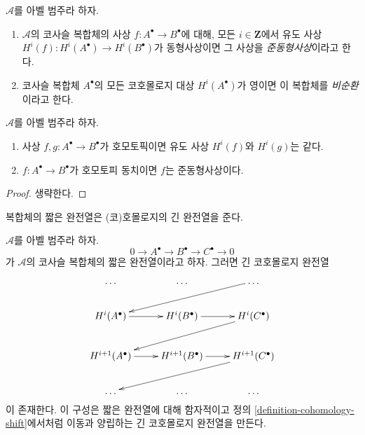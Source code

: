 \begin{definition}
\label{definition-quasi-isomorphism-cochain}
$\mathcal{A}$를 아벨 범주라 하자.
\begin{enumerate}
\item $\mathcal{A}$의 코사슬 복합체의 사상
$f : A^\bullet \to B^\bullet$에 대해, 모든 $i \in \mathbf{Z}$에서
유도 사상 $H^i(f) : H^i(A^\bullet) \to H^i(B^\bullet)$가
동형사상이면 그 사상을 {\it 준동형사상}이라고 한다.
\item 코사슬 복합체 $A^\bullet$의 모든 코호몰로지 대상
$H^i(A^\bullet)$가 영이면 이 복합체를 {\it 비순환}이라고 한다.
\end{enumerate}
\end{definition}

\begin{lemma}
\label{lemma-map-cohomology-homotopy-cochain}
$\mathcal{A}$를 아벨 범주라 하자.
\begin{enumerate}
\item 사상 $f, g : A^\bullet \to B^\bullet$가 호모토픽이면
유도 사상 $H^i(f)$와 $H^i(g)$는 같다.
\item $f : A^\bullet \to B^\bullet$가 호모토피 동치이면
$f$는 준동형사상이다.
\end{enumerate}
\end{lemma}

\begin{proof}
생략한다.
\end{proof}

\begin{lemma}
\label{lemma-long-exact-sequence-cochain}
\begin{slogan}
복합체의 짧은 완전열은 (코)호몰로지의 긴 완전열을 준다.
\end{slogan}
$\mathcal{A}$를 아벨 범주라 하자.
$$
0 \to
A^\bullet \to
B^\bullet \to
C^\bullet \to
0
$$
가 $\mathcal{A}$의 코사슬 복합체의 짧은 완전열이라고 하자.
그러면 긴 코호몰로지 완전열
$$
\xymatrix{
\ldots & \ldots & \ldots \ar[lld] \\
H^i(A^\bullet) \ar[r] &
H^i(B^\bullet) \ar[r] &
H^i(C^\bullet) \ar[lld] \\
H^{i + 1}(A^\bullet) \ar[r] &
H^{i + 1}(B^\bullet) \ar[r] &
H^{i + 1}(C^\bullet) \ar[lld] \\
\ldots & \ldots & \ldots \\
}
$$
이 존재한다. 이 구성은 짧은 완전열에 대해 함자적이고 정의
\ref{definition-cohomology-shift}에서처럼 이동과 양립하는 긴
코호몰로지 완전열을 만든다.
\end{lemma}

